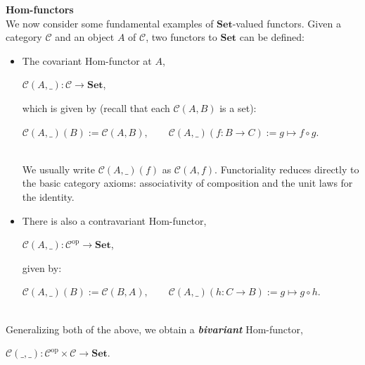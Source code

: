 \documentclass[]{amsbook}
\newcommand{\qq}{\qquad}
\newcommand{\catname}[1]{\mathbf{#1}}
\newcommand{\0}{\mathbf{0}}
\newcommand{\1}{\mathbf{1}}
\newcommand{\mc}[1]{\mathcal{#1}}
\begin{document}
\textbf{Hom-functors}\\
We now consider some fundamental examples of $\catname{Set}$-valued functors.
Given a category $\mc{C}$ and an object $A$ of $\mc{C}$, two functors to
$\catname{Set}$ can be defined:
\begin{itemize}
    \item The covariant Hom-functor at $A$,
    \begin{center}
        $\mc{C}(A, \_) : \mc{C} \to \catname{Set}$,
    \end{center}
    which is given by (recall that each $\mc{C}(A, B)$ is a set):
    \begin{center}
        $\mc{C}(A, \_)(B) := \mc{C}(A, B), \qq
        \mc{C}(A, \_)(f: B \to C) := g \mapsto f \circ g$.
    \end{center}
~\\
    We usually write $\mc{C}(A, \_)(f)$ as $\mc{C}(A, f)$. Functoriality
    reduces directly to the basic category axioms: associativity of composition
    and the unit laws for the identity.

    \item There is also a contravariant Hom-functor,
    \begin{center}
        $\mc{C}(A, \_) : \mc{C}^{\text{op}} \to \catname{Set}$,
    \end{center}
    given by:
    \begin{center}
        $\mc{C}(A, \_)(B) := \mc{C}(B, A), \qq
        \mc{C}(A, \_)(h: C \to B) := g \mapsto g \circ h$.
    \end{center}
\end{itemize}
~\\
Generalizing both of the above, we obtain a \emph{\textbf{bivariant}}
Hom-functor,
\begin{center}
    $\mc{C}(\_, \_) : \mc{C}^{\text{op}} \times \mc{C} \to \catname{Set}$.
\end{center}
\end{document}
